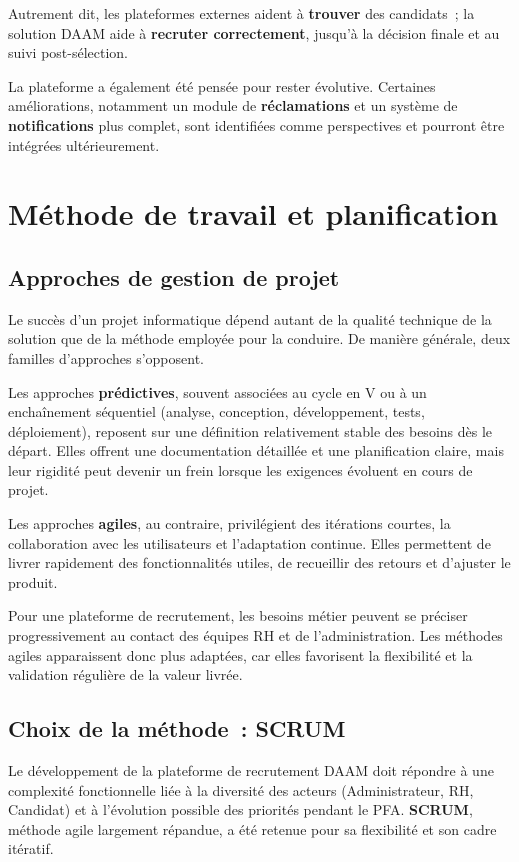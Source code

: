 Autrement dit, les plateformes externes aident à \textbf{trouver} des
candidats~; la solution DAAM aide à \textbf{recruter correctement}, jusqu'à
la décision finale et au suivi post-sélection.

La plateforme a également été pensée pour rester évolutive. Certaines
améliorations, notamment un module de \textbf{réclamations} et un système de
\textbf{notifications} plus complet, sont identifiées comme perspectives et
pourront être intégrées ultérieurement.


\section{Méthode de travail et planification}

\subsection{Approches de gestion de projet}

Le succès d'un projet informatique dépend autant de la qualité technique de la
solution que de la méthode employée pour la conduire. De manière générale,
deux familles d'approches s'opposent.

Les approches \textbf{prédictives}, souvent associées au cycle en V ou à un
enchaînement séquentiel (analyse, conception, développement, tests,
déploiement), reposent sur une définition relativement stable des besoins dès
le départ. Elles offrent une documentation détaillée et une planification
claire, mais leur rigidité peut devenir un frein lorsque les exigences
évoluent en cours de projet.

Les approches \textbf{agiles}, au contraire, privilégient des itérations
courtes, la collaboration avec les utilisateurs et l'adaptation continue.
Elles permettent de livrer rapidement des fonctionnalités utiles, de recueillir
des retours et d'ajuster le produit.

Pour une plateforme de recrutement, les besoins métier peuvent se préciser
progressivement au contact des équipes RH et de l'administration. Les méthodes
agiles apparaissent donc plus adaptées, car elles favorisent la flexibilité et
la validation régulière de la valeur livrée.


\subsection{Choix de la méthode~: SCRUM}

Le développement de la plateforme de recrutement DAAM doit répondre à une
complexité fonctionnelle liée à la diversité des acteurs (Administrateur, RH,
Candidat) et à l'évolution possible des priorités pendant le PFA.
\textbf{SCRUM}, méthode agile largement répandue, a été retenue pour sa
flexibilité et son cadre itératif.

